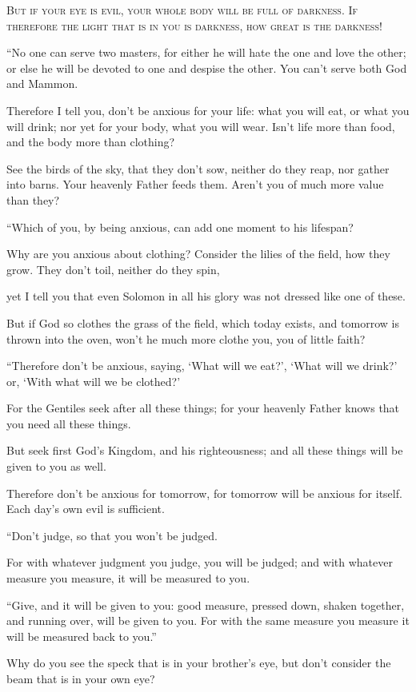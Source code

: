 \lettrine{B}{ut if your eye is evil, your whole body will be full of darkness. If therefore the light that is in you is darkness, how great is the darkness!}

“No one can serve two masters, for either he will hate the one and love the other; or else he will be devoted to one and despise the other. You can’t serve both God and Mammon.

Therefore I tell you, don’t be anxious for your life: what you will eat, or what you will drink; nor yet for your body, what you will wear. Isn’t life more than food, and the body more than clothing?

See the birds of the sky, that they don’t sow, neither do they reap, nor gather into barns. Your heavenly Father feeds them. Aren’t you of much more value than they?

“Which of you, by being anxious, can add one moment to his lifespan?

Why are you anxious about clothing? Consider the lilies of the field, how they grow. They don’t toil, neither do they spin,

yet I tell you that even Solomon in all his glory was not dressed like one of these.

But if God so clothes the grass of the field, which today exists, and tomorrow is thrown into the oven, won’t he much more clothe you, you of little faith?

“Therefore don’t be anxious, saying, ‘What will we eat?’, ‘What will we drink?’ or, ‘With what will we be clothed?’

For the Gentiles seek after all these things; for your heavenly Father knows that you need all these things.

But seek first God’s Kingdom, and his righteousness; and all these things will be given to you as well.

Therefore don’t be anxious for tomorrow, for tomorrow will be anxious for itself. Each day’s own evil is sufficient.

“Don’t judge, so that you won’t be judged.

For with whatever judgment you judge, you will be judged; and with whatever measure you measure, it will be measured to you.

“Give, and it will be given to you: good measure, pressed down, shaken together, and running over, will be given to you. For with the same measure you measure it will be measured back to you.”

Why do you see the speck that is in your brother’s eye, but don’t consider the beam that is in your own eye?

